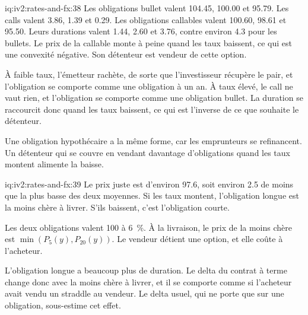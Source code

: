 \begin{solution}{iq:iv2:rates-and-fx:38}
Les obligations bullet valent 104.45, 100.00 et 95.79. Les calls valent 3.86, 1.39 et 0.29. Les obligations callables valent 100.60, 98.61 et 95.50. Leurs durations valent 1.44, 2.60 et 3.76, contre environ 4.3 pour les bullets. Le prix de la callable monte à peine quand les taux baissent, ce qui est une convexité négative. Son détenteur est vendeur de cette option.

À faible taux, l'émetteur rachète, de sorte que l'investisseur récupère le pair, et l'obligation se comporte comme une obligation à un an. À taux élevé, le call ne vaut rien, et l'obligation se comporte comme une obligation bullet. La duration se raccourcit donc quand les taux baissent, ce qui est l'inverse de ce que souhaite le détenteur.

Une obligation hypothécaire a la même forme, car les emprunteurs se refinancent. Un détenteur qui se couvre en vendant davantage d'obligations quand les taux montent alimente la baisse.

\end{solution}

\begin{solution}{iq:iv2:rates-and-fx:39}
Le prix juste est d'environ 97.6, soit environ 2.5 de moins que la plus basse des deux moyennes. Si les taux montent, l'obligation longue est la moins chère à livrer. S'ils baissent, c'est l'obligation courte.

\begin{sloppypar}Les deux obligations valent 100 à 6~\%. À la livraison, le prix de la moins chère est $\min(P_5(y), P_{20}(y))$. Le vendeur détient une option, et elle coûte à l'acheteur.\end{sloppypar}

L'obligation longue a beaucoup plus de duration. Le delta du contrat à terme change donc avec la moins chère à livrer, et il se comporte comme si l'acheteur avait vendu un straddle au vendeur. Le delta usuel, qui ne porte que sur une obligation, sous-estime cet effet.

\end{solution}

